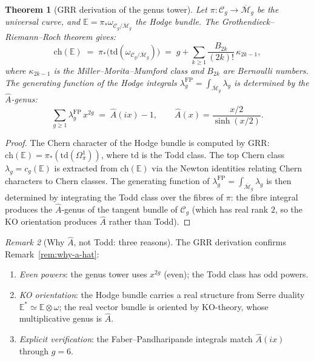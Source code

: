 \documentclass[11pt,reqno]{amsart}
\newtheorem{theorem}{Theorem}[section]
\theoremstyle{definition}
\theoremstyle{remark}
\newtheorem{remark}[theorem]{Remark}
\begin{document}
\begin{theorem}[GRR derivation of the genus tower]
\label{thm:grr-derivation}
Let $\pi\colon \mathcal{C}_g \to \overline{\mathcal{M}}_g$ be the
universal curve, and $\mathbb{E} = \pi_*\omega_{\mathcal{C}_g/
\overline{\mathcal{M}}_g}$ the Hodge bundle. The
Grothendieck--Riemann--Roch theorem gives:
\begin{equation}\label{eq:grr}
\mathrm{ch}(\mathbb{E})
\;=\;
\pi_*\bigl(\mathrm{td}(\omega_{\mathcal{C}_g/
\overline{\mathcal{M}}_g})\bigr)
\;=\;
g + \sum_{k \ge 1}
\frac{B_{2k}}{(2k)!}\,\kappa_{2k-1},
\end{equation}
where $\kappa_{2k-1}$ is the Miller--Morita--Mumford class and
$B_{2k}$ are Bernoulli numbers. The generating function of
the Hodge integrals $\lambda_g^{\mathrm{FP}}
= \int_{\overline{\mathcal{M}}_g}\lambda_g$
is determined by the $\hat{A}$-genus:
\begin{equation}\label{eq:grr-ahat}
\sum_{g \ge 1} \lambda_g^{\mathrm{FP}}\,x^{2g}
\;=\;
\hat{A}(ix) - 1,
\qquad
\hat{A}(x) = \frac{x/2}{\sinh(x/2)}.
\end{equation}
\end{theorem}

\begin{proof}
The Chern character of the Hodge bundle is computed by GRR:
$\mathrm{ch}(\mathbb{E}) = \pi_*(\mathrm{td}(\Omega^1_{\pi}))$,
where $\mathrm{td}$ is the Todd class. The top
Chern class $\lambda_g = c_g(\mathbb{E})$ is extracted from
$\mathrm{ch}(\mathbb{E})$ via the Newton identities relating
Chern characters to Chern classes. The generating function
of $\lambda_g^{\mathrm{FP}} = \int_{\overline{\mathcal{M}}_g}
\lambda_g$ is then determined by integrating the Todd class
over the fibres of $\pi$: the fibre integral produces the
$\hat{A}$-genus of the tangent bundle of $\mathcal{C}_g$
(which has real rank $2$, so the KO orientation produces
$\hat{A}$ rather than Todd).
\end{proof}

\begin{remark}[Why $\hat{A}$, not Todd: three reasons]
\label{rem:why-ahat-grr}
The GRR derivation confirms Remark~\ref{rem:why-a-hat}:
\begin{enumerate}[label=(\alph*)]
\item \emph{Even powers}: the genus tower uses $x^{2g}$
  (even); the Todd class has odd powers.
\item \emph{KO orientation}: the Hodge bundle carries a real
  structure from Serre duality
  $\mathbb{E}^* \simeq \mathbb{E} \otimes \omega$; the
  real vector bundle is oriented by KO-theory, whose
  multiplicative genus is $\hat{A}$.
\item \emph{Explicit verification}: the Faber--Pandharipande
  integrals match $\hat{A}(ix)$ through $g = 6$.
\end{enumerate}
\end{remark}
\end{document}
